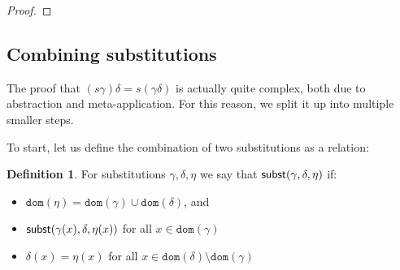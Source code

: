 \documentclass{lmcs}
\theoremstyle{theorem}\newtheorem{theorem}{Theorem}
\theoremstyle{theorem}\newtheorem{lemma}[theorem]{Lemma}
\theoremstyle{theorem}\newtheorem{corollary}[theorem]{Corollary}
\theoremstyle{definition}\newtheorem{definition}[theorem]{Definition}
\theoremstyle{definition}\newtheorem{example}[theorem]{Example}
\newcommand{\V}{\mathcal{V}}
\newcommand{\M}{\mathcal{M}}
\newcommand{\FMV}{\mathit{MV}}
\newcommand{\domain}{\mathtt{dom}}
\newcommand{\avar}{x}
\newcommand{\bvar}{y}
\newcommand{\cvar}{z}
\newcommand{\Avar}{X}
\begin{document}
\begin{proof}
\end{proof}

\subsection{Combining substitutions}

The proof that $(s\gamma)\delta = s(\gamma\delta)$ is actually quite complex,
both due to abstraction and meta-application.  For this reason, we split it up
into multiple smaller steps.

To start, let us define the combination of two substitutions as a relation:

\begin{definition}
For substitutions $\gamma,\delta,\eta$ we say that $\mathsf{subst}(\gamma,\delta,\eta)$
if:
\begin{itemize}
\item $\domain(\eta) = \domain(\gamma) \cup \domain(\delta)$, and
\item $\subrel{\gamma(\avar),\delta,\eta(\avar)}$ for all $\avar \in
  \domain(\gamma)$
\item $\delta(\avar) = \eta(\avar)$ for all $\avar \in \domain(\delta) \setminus
  \domain(\gamma)$
\end{itemize}
\end{definition}
\end{document}
